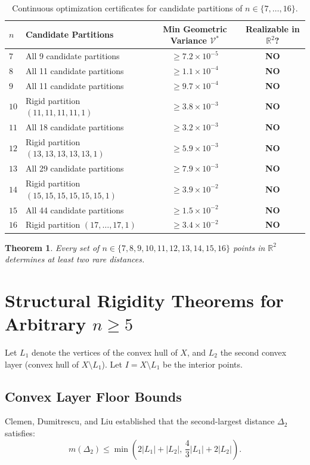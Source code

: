 \documentclass[11pt,reqno]{article}
\newtheorem{theorem}{Theorem}
\theoremstyle{definition}
\begin{document}
\begin{table}[ht]
\centering
\caption{Continuous optimization certificates for candidate partitions of $n \in \{7, \dots, 16\}$.}
\begin{tabular}{@{}llcc@{}}
\toprule
$n$ & Candidate Partitions & Min Geometric Variance $\mathcal{V}^*$ & Realizable in $\mathbb{R}^2$? \\
\midrule
$7$ & All 9 candidate partitions & $\ge 7.2 \times 10^{-5}$ & \textbf{NO} \\
$8$ & All 11 candidate partitions & $\ge 1.1 \times 10^{-4}$ & \textbf{NO} \\
$9$ & All 11 candidate partitions & $\ge 9.7 \times 10^{-4}$ & \textbf{NO} \\
$10$ & Rigid partition $(11, 11, 11, 11, 1)$ & $\ge 3.8 \times 10^{-3}$ & \textbf{NO} \\
$11$ & All 18 candidate partitions & $\ge 3.2 \times 10^{-3}$ & \textbf{NO} \\
$12$ & Rigid partition $(13, 13, 13, 13, 13, 1)$ & $\ge 5.9 \times 10^{-3}$ & \textbf{NO} \\
$13$ & All 29 candidate partitions & $\ge 7.9 \times 10^{-3}$ & \textbf{NO} \\
$14$ & Rigid partition $(15, 15, 15, 15, 15, 15, 1)$ & $\ge 3.9 \times 10^{-2}$ & \textbf{NO} \\
$15$ & All 44 candidate partitions & $\ge 1.5 \times 10^{-2}$ & \textbf{NO} \\
$16$ & Rigid partition $(17, \dots, 17, 1)$ & $\ge 3.4 \times 10^{-2}$ & \textbf{NO} \\
\bottomrule
\end{tabular}
\end{table}

\begin{theorem}
Every set of $n \in \{7, 8, 9, 10, 11, 12, 13, 14, 15, 16\}$ points in $\mathbb{R}^2$ determines at least two rare distances.
\end{theorem}

\section{Structural Rigidity Theorems for Arbitrary $n \ge 5$}

Let $L_1$ denote the vertices of the convex hull of $X$, and $L_2$ the second convex layer (convex hull of $X \setminus L_1$). Let $I = X \setminus L_1$ be the interior points.

\subsection{Convex Layer Floor Bounds}
Clemen, Dumitrescu, and Liu \cite{CDL25} established that the second-largest distance $\Delta_2$ satisfies:
\[
m(\Delta_2) \le \min\left( 2|L_1| + |L_2|, \, \frac{4}{3}|L_1| + 2|L_2| \right).
\]
\end{document}
